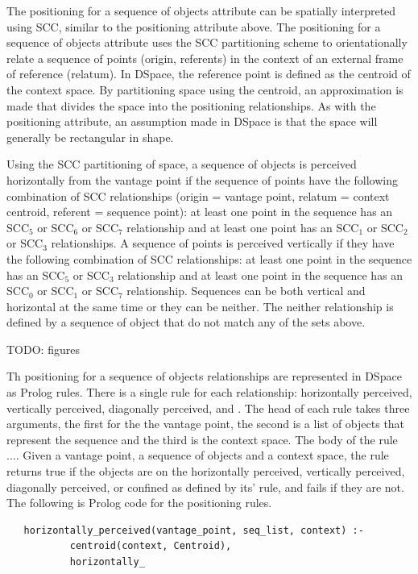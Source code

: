 \documentclass[12pt]{ucthesis}
\begin{document}
The positioning for a sequence of objects attribute can be spatially interpreted using SCC, similar to the positioning attribute above. The positioning for a sequence of objects attribute uses the SCC partitioning scheme to orientationally relate a sequence of points (origin, referents) in the context of an external frame of reference (relatum). In DSpace, the reference point is defined as the centroid of the context space. By partitioning space using the centroid, an approximation is made that divides the space into the positioning relationships. As with the positioning attribute, an assumption made in DSpace is that the space will generally be rectangular in shape.

Using the SCC partitioning of space, a sequence of objects is perceived horizontally from the vantage point if the sequence of points have the following combination of SCC relationships (origin = vantage point, relatum = context centroid, referent = sequence point): at least one point in the sequence has an SCC$_{5}$ or SCC$_{6}$ or SCC$_{7}$ relationship and at least one point has an SCC$_{1}$ or SCC$_{2}$ or SCC$_{3}$ relationships. A sequence of points is perceived vertically if they have the following combination of SCC relationships: at least one point in the sequence has an SCC$_{5}$ or SCC$_{3}$ relationship and at least one point in the sequence has an SCC$_{0}$ or SCC$_{1}$ or SCC$_{7}$ relationship. Sequences can be both vertical and horizontal at the same time or they can be neither. The neither relationship is defined by a sequence of object that do not match any of the sets above.

TODO: figures

Th positioning for a sequence of objects relationships are represented in DSpace as Prolog rules. There is a single rule for each relationship: horizontally perceived, vertically perceived, diagonally perceived, and . The head of each rule takes three arguments, the first for the the vantage point, the second is a list of objects that represent the sequence and the third is the context space. The body of the rule .... Given a vantage point, a sequence of objects and a context space, the rule returns true if the objects are on the horizontally perceived, vertically perceived, diagonally perceived, or confined as defined by its' rule, and fails if they are not. The following is Prolog code for the positioning rules.
\begin{verbatim}
   horizontally_perceived(vantage_point, seq_list, context) :-
           centroid(context, Centroid),
           horizontally_
\end{verbatim}
\end{document}
